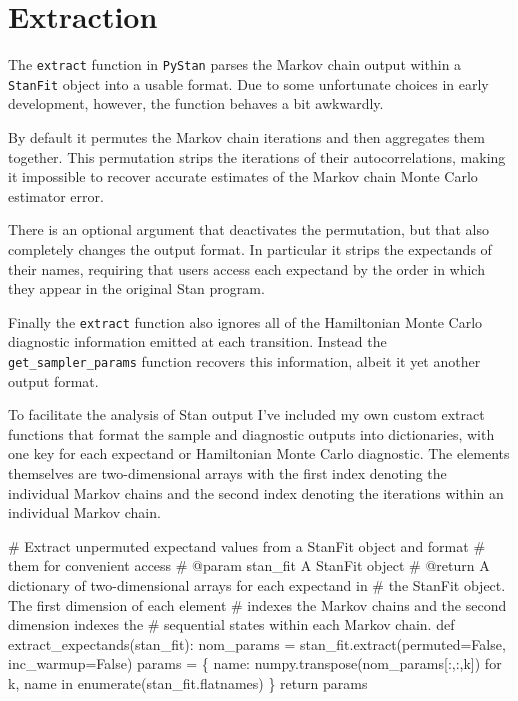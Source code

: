 \documentclass[
  letterpaper,
  DIV=11,
  numbers=noendperiod]{scrartcl}
\newenvironment{Shaded}{\begin{snugshade}}{\end{snugshade}}
\newcommand{\BuiltInTok}[1]{\textcolor[rgb]{0.00,0.23,0.31}{#1}}
\newcommand{\CommentTok}[1]{\textcolor[rgb]{0.37,0.37,0.37}{#1}}
\newcommand{\ControlFlowTok}[1]{\textcolor[rgb]{0.00,0.23,0.31}{#1}}
\newcommand{\KeywordTok}[1]{\textcolor[rgb]{0.00,0.23,0.31}{#1}}
\newcommand{\NormalTok}[1]{\textcolor[rgb]{0.00,0.23,0.31}{#1}}
\newcommand{\OperatorTok}[1]{\textcolor[rgb]{0.37,0.37,0.37}{#1}}
\newcommand{\VariableTok}[1]{\textcolor[rgb]{0.07,0.07,0.07}{#1}}
\begin{document}
\hypertarget{extraction}{%
\section{Extraction}\label{extraction}}

The \texttt{extract} function in \texttt{PyStan} parses the Markov chain
output within a \texttt{StanFit} object into a usable format. Due to
some unfortunate choices in early development, however, the function
behaves a bit awkwardly.

By default it permutes the Markov chain iterations and then aggregates
them together. This permutation strips the iterations of their
autocorrelations, making it impossible to recover accurate estimates of
the Markov chain Monte Carlo estimator error.

There is an optional argument that deactivates the permutation, but that
also completely changes the output format. In particular it strips the
expectands of their names, requiring that users access each expectand by
the order in which they appear in the original Stan program.

Finally the \texttt{extract} function also ignores all of the
Hamiltonian Monte Carlo diagnostic information emitted at each
transition. Instead the \texttt{get\_sampler\_params} function recovers
this information, albeit it yet another output format.

To facilitate the analysis of Stan output I've included my own custom
extract functions that format the sample and diagnostic outputs into
dictionaries, with one key for each expectand or Hamiltonian Monte Carlo
diagnostic. The elements themselves are two-dimensional arrays with the
first index denoting the individual Markov chains and the second index
denoting the iterations within an individual Markov chain.

\begin{Shaded}
\begin{Highlighting}[]
\CommentTok{\# Extract unpermuted expectand values from a StanFit object and format }
\CommentTok{\# them for convenient access}
\CommentTok{\# @param stan\_fit A StanFit object}
\CommentTok{\# @return A dictionary of two{-}dimensional arrays for each expectand in }
\CommentTok{\#         the StanFit object.  The first dimension of each element }
\CommentTok{\#         indexes the Markov chains and the second dimension indexes the }
\CommentTok{\#         sequential states within each Markov chain. }
\KeywordTok{def}\NormalTok{ extract\_expectands(stan\_fit):}
\NormalTok{  nom\_params }\OperatorTok{=}\NormalTok{ stan\_fit.extract(permuted}\OperatorTok{=}\VariableTok{False}\NormalTok{, inc\_warmup}\OperatorTok{=}\VariableTok{False}\NormalTok{)}
\NormalTok{  params }\OperatorTok{=}\NormalTok{ \{ name: numpy.transpose(nom\_params[:,:,k]) }
             \ControlFlowTok{for}\NormalTok{ k, name }\KeywordTok{in} \BuiltInTok{enumerate}\NormalTok{(stan\_fit.flatnames) \}}
  \ControlFlowTok{return}\NormalTok{ params}
\end{Highlighting}
\end{Shaded}
\end{document}

